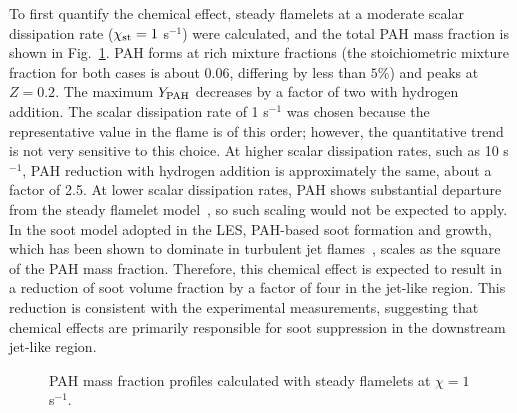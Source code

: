 To first quantify the chemical effect, steady flamelets at a moderate scalar dissipation rate ($\chi_{\rm st} = 1$ s$^{-1}$) were calculated, and the total PAH mass fraction is shown in Fig.~\ref{fig:flamelet}.  PAH forms at rich mixture fractions (the stoichiometric mixture fraction for both cases is about $0.06$, differing by less than $5$\%) and peaks at $Z = 0.2$.  The maximum $Y_{\rm PAH}$ decreases by a factor of two with hydrogen addition.  The scalar dissipation rate of 1 s$^{-1}$ was chosen because the representative value in the flame is of this order; however, the quantitative trend is not very sensitive to this choice.  At higher scalar dissipation rates, such as 10 s$^{-1}$, PAH reduction with hydrogen addition is approximately the same, about a factor of 2.5.  At lower scalar dissipation rates, PAH shows substantial departure from the steady flamelet model~\cite{bisetti12}, so such scaling would not be expected to apply.  In the soot model adopted in the LES, PAH-based soot formation and growth, which has been shown to dominate in turbulent jet flames~\cite{bisetti12,attili14,attili15,mueller12,mueller13}, scales as the square of the PAH mass fraction.  Therefore, this chemical effect is expected to result in a reduction of soot volume fraction by a factor of four in the jet-like region.  This reduction is consistent with the experimental measurements, suggesting that chemical effects are primarily responsible for soot suppression in the downstream jet-like region.

\begin{figure}[t]
  \centering
  \scriptsize
  \resizebox{0.7\textwidth}{!}{}
  \normalsize
  \caption{PAH mass fraction profiles calculated with steady flamelets at $\chi = 1$ s$^{-1}$.}
  \label{fig:flamelet}
\end{figure}


